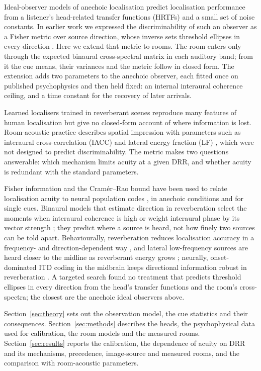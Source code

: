\documentclass[11pt]{article}
\begin{document}
Ideal-observer models of anechoic localisation \citep{reijniers2014,barumerli2023} predict localisation performance from a listener's head-related transfer functions (HRTFs) and a small set of noise constants. In earlier work we expressed the discriminability of such an observer as a Fisher metric over source direction, whose inverse sets threshold ellipses in every direction \citep{bassett2026}. Here we extend that metric to rooms. The room enters only through the expected binaural cross-spectral matrix in each auditory band; from it the cue means, their variances and the metric follow in closed form. The extension adds two parameters to the anechoic observer, each fitted once on published psychophysics and then held fixed: an internal interaural coherence ceiling, and a time constant for the recovery of later arrivals.

Learned localisers trained in reverberant scenes reproduce many features of human localisation \citep{francl2022} but give no closed-form account of where information is lost. Room-acoustic practice describes spatial impression with parameters such as interaural cross-correlation (IACC) and lateral energy fraction (LF) \citep{iso3382}, which were not designed to predict discriminability. The metric makes two questions answerable: which mechanism limits acuity at a given DRR, and whether acuity is redundant with the standard parameters.

Fisher information and the Cram\'er--Rao bound have been used to relate localisation acuity to neural population codes \citep{jenison2000,harper2004}, in anechoic conditions and for single cues. Binaural models that estimate direction in reverberation select the moments when interaural coherence is high \citep{faller2004} or weight interaural phase by its vector strength \citep{dietz2011}; they predict where a source is heard, not how finely two sources can be told apart. Behaviourally, reverberation reduces localisation accuracy in a frequency- and direction-dependent way \citep{hartmann1983,giguere1993}, and lateral low-frequency sources are heard closer to the midline as reverberant energy grows \citep{ihlefeld2011}; neurally, onset-dominated ITD coding in the midbrain keeps directional information robust in reverberation \citep{devore2009}. A targeted search found no treatment that predicts threshold ellipses in every direction from the head's transfer functions and the room's cross-spectra; the closest are the anechoic ideal observers above.

Section~\ref{sec:theory} sets out the observation model, the cue statistics and their consequences. Section~\ref{sec:methods} describes the heads, the psychophysical data used for calibration, the room models and the measured rooms. Section~\ref{sec:results} reports the calibration, the dependence of acuity on DRR and its mechanisms, precedence, image-source and measured rooms, and the comparison with room-acoustic parameters.
\end{document}
